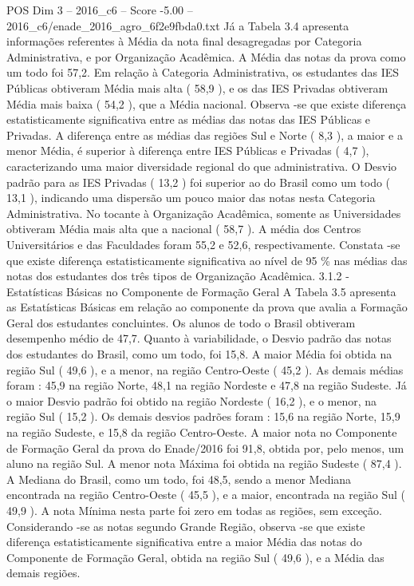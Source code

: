 \begin{textsample}{POS Dim 3 – 2016\_c6 – Score -5.00 – 2016\_c6/enade\_2016\_agro\_6f2e9fbda0.txt}
Já a Tabela 3.4 apresenta informações referentes à Média da nota final desagregadas por Categoria Administrativa, e por Organização Acadêmica.
A Média das notas da prova como um todo foi 57,2.
Em relação à Categoria Administrativa, os estudantes das IES Públicas obtiveram Média mais alta ( 58,9 ), e os das IES Privadas obtiveram Média mais baixa ( 54,2 ), que a Média nacional.
Observa -se que existe diferença estatisticamente significativa entre as médias das notas das IES Públicas e Privadas.
A diferença entre as médias das regiões Sul e Norte ( 8,3 ), a maior e a menor Média, é superior à diferença entre IES Públicas e Privadas ( 4,7 ), caracterizando uma maior diversidade regional do que administrativa.
O Desvio padrão para as IES Privadas ( 13,2 ) foi superior ao do Brasil como um todo ( 13,1 ), indicando uma dispersão um pouco maior das notas nesta Categoria Administrativa.
No tocante à Organização Acadêmica, somente as Universidades obtiveram Média mais alta que a nacional ( 58,7 ).
A média dos Centros Universitários e das Faculdades foram 55,2 e 52,6, respectivamente.
Constata -se que existe diferença estatisticamente significativa ao nível de 95 \% nas médias das notas dos estudantes dos três tipos de Organização Acadêmica. 3.1.2 - Estatísticas Básicas no Componente de Formação Geral A Tabela 3.5 apresenta as Estatísticas Básicas em relação ao componente da prova que avalia a Formação Geral dos estudantes concluintes.
Os alunos de todo o Brasil obtiveram desempenho médio de 47,7.
Quanto à variabilidade, o Desvio padrão das notas dos estudantes do Brasil, como um todo, foi 15,8.
A maior Média foi obtida na região Sul ( 49,6 ), e a menor, na região Centro-Oeste ( 45,2 ).
As demais médias foram : 45,9 na região Norte, 48,1 na região Nordeste e 47,8 na região Sudeste.
Já o maior Desvio padrão foi obtido na região Nordeste ( 16,2 ), e o menor, na região Sul ( 15,2 ).
Os demais desvios padrões foram : 15,6 na região Norte, 15,9 na região Sudeste, e 15,8 da região Centro-Oeste.
A maior nota no Componente de Formação Geral da prova do Enade/2016 foi 91,8, obtida por, pelo menos, um aluno na região Sul.
A menor nota Máxima foi obtida na região Sudeste ( 87,4 ).
A Mediana do Brasil, como um todo, foi 48,5, sendo a menor Mediana encontrada na região Centro-Oeste ( 45,5 ), e a maior, encontrada na região Sul ( 49,9 ).
A nota Mínima nesta parte foi zero em todas as regiões, sem exceção.
Considerando -se as notas segundo Grande Região, observa -se que existe diferença estatisticamente significativa entre a maior Média das notas do Componente de Formação Geral, obtida na região Sul ( 49,6 ), e a Média das demais regiões.

\end{textsample}
